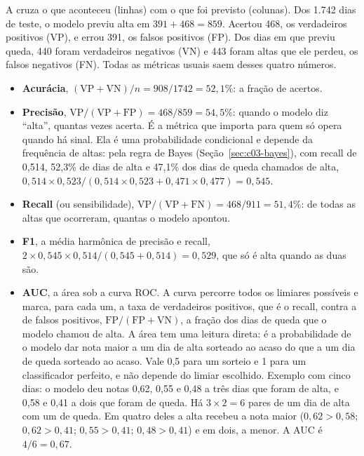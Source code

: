A  cruza o que aconteceu (linhas) com o que foi previsto (colunas). Dos 1.742 dias de teste, o modelo previu alta em $391 + 468 = 859$. Acertou 468, os verdadeiros positivos (VP), e errou 391, os falsos positivos (FP). Dos dias em que previu queda, 440 foram verdadeiros negativos (VN) e 443 foram altas que ele perdeu, os falsos negativos (FN). Todas as métricas usuais saem desses quatro números.

\begin{itemize}
  \item \textbf{Acurácia}, $(\text{VP} + \text{VN})/n = 908/1742 = 52,1\%$: a fração de acertos.
  \item \textbf{Precisão}, $\text{VP}/(\text{VP} + \text{FP}) = 468/859 = 54,5\%$: quando o modelo diz ``alta'', quantas vezes acerta. É a métrica que importa para quem só opera quando há sinal. Ela é uma probabilidade condicional e depende da frequência de altas: pela regra de Bayes (Seção~\ref{sec:c03-bayes}), com recall de 0,514, 52,3\% de dias de alta e 47,1\% dos dias de queda chamados de alta, $0,514 \times 0,523/(0,514 \times 0,523 + 0,471 \times 0,477) = 0,545$.
  \item \textbf{Recall} (ou sensibilidade), $\text{VP}/(\text{VP} + \text{FN}) = 468/911 = 51,4\%$: de todas as altas que ocorreram, quantas o modelo apontou.
  \item \textbf{F1}, a média harmônica de precisão e recall, $2 \times 0,545 \times 0,514 / (0,545 + 0,514) = 0,529$, que só é alta quando as duas são.
  \item \textbf{AUC}, a área sob a curva ROC. A curva percorre todos os limiares possíveis e marca, para cada um, a taxa de verdadeiros positivos, que é o recall, contra a de falsos positivos, $\text{FP}/(\text{FP} + \text{VN})$, a fração dos dias de queda que o modelo chamou de alta. A área tem uma leitura direta: é a probabilidade de o modelo dar nota maior a um dia de alta sorteado ao acaso do que a um dia de queda sorteado ao acaso. Vale 0,5 para um sorteio e 1 para um classificador perfeito, e não depende do limiar escolhido. Exemplo com cinco dias: o modelo deu notas 0,62, 0,55 e 0,48 a três dias que foram de alta, e 0,58 e 0,41 a dois que foram de queda. Há $3 \times 2 = 6$ pares de um dia de alta com um de queda. Em quatro deles a alta recebeu a nota maior ($0,62 > 0,58$; $0,62 > 0,41$; $0,55 > 0,41$; $0,48 > 0,41$) e em dois, a menor. A AUC é $4/6 = 0,67$.
\end{itemize}

